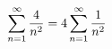 \documentclass[preview]{standalone}
\begin{document}
\begin{align*}
\special{dvisvgm:raw <g id='unique000'>}\displaystyle\sum_{n=1}^{\infty}\dfrac{4}{n^2}=4\sum_{n=1}^{\infty}\dfrac{1}{n^2}\special{dvisvgm:raw </g>}
\end{align*}
\end{document}
